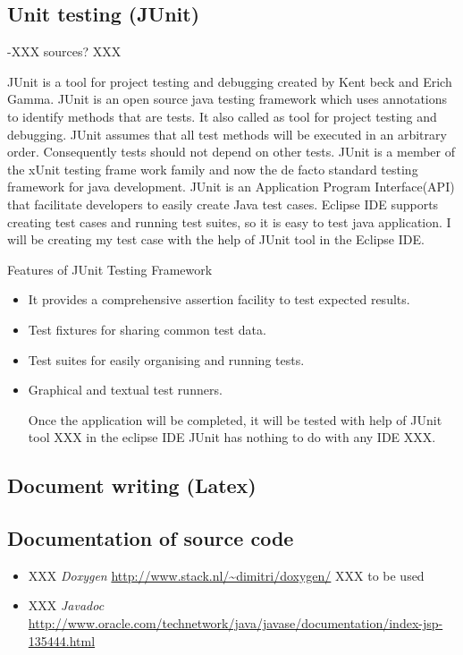 \documentclass{report}
\begin{document}
\subsection{Unit testing (JUnit)}
\label{sec:junit}

-XXX sources? XXX

JUnit is a tool for project testing and debugging created by Kent beck and Erich Gamma.
JUnit is an open source java testing framework which uses annotations to identify methods that are tests. It also called as tool for project testing and debugging. JUnit assumes that all test methods will be executed in an arbitrary order. Consequently tests should not depend on other tests.
JUnit is a member of the xUnit testing frame work family and now the de facto standard testing framework for java development. JUnit is an Application Program Interface(API) that facilitate developers to easily create Java test cases.
Eclipse IDE supports creating test cases and running test suites, so it is easy to test java application.
I will be creating my test case with the help of JUnit tool in the Eclipse IDE.

Features of JUnit Testing Framework
\begin{itemize}

\item It provides a comprehensive assertion facility to test expected results.
\item Test fixtures for sharing common test data.
\item Test suites for easily organising and running tests.
\item Graphical and textual test runners.

Once the application will be completed, it will be tested with help of JUnit tool XXX in the eclipse IDE  JUnit has nothing to do with any IDE XXX.


\end{itemize}

\subsection{Document writing (Latex)}
\label{sec:latex}

\subsection{Documentation of source code}
\label{sec:documentsource}

\begin{itemize}
\item XXX \textit{Doxygen} \url{http://www.stack.nl/~dimitri/doxygen/} XXX to be used
\item XXX \textit{Javadoc} \url{http://www.oracle.com/technetwork/java/javase/documentation/index-jsp-135444.html}
\end{itemize}
\end{document}
